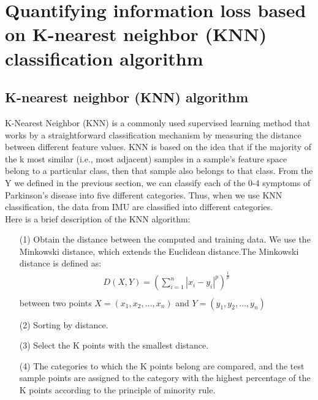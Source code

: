 \chapter{Quantifying information loss based on K-nearest neighbor (KNN) classification algorithm}


\section{K-nearest neighbor (KNN) algorithm}
K-Nearest Neighbor (KNN)\cite{peterson2009k} is a commonly used supervised learning method that works by a straightforward classification mechanism by measuring the distance between different feature values. \cite{altman1992introduction} KNN is based on the idea that if the majority of the k most similar (i.e., most adjacent) samples in a sample's feature space belong to a particular class, then that sample also belongs to that class. From the Y we defined in the previous section, we can classify each of the 0-4 symptoms of Parkinson's disease into five different categories. Thus, when we use KNN classification, the data from IMU are classified into different categories.\\
Here is a brief description of the KNN algorithm:   \cite{guo2003knn,zhang2017learning}

\begin{itemize}
    \item [(1)]
    Obtain the distance between the computed and training data. We use the Minkowski distance, which extends the Euclidean distance.The Minkowski distance \cite{singh2013k} is defined as:
    \begin{equation}\nonumber
    \begin{aligned}
    D(X,Y) = (\sum_{i=1}^{n}\left | x_{i} - y_{i}   \right |^{p})^{\frac{1}{p} } \\
    \end{aligned}
    \end{equation}
    between two points $ X = (x_{1},x_{2},\dots ,x_{n} )$ and $ Y = (y_{1},y_{2},\dots ,y_{n})$ 
    \item [(2)] Sorting by distance.
    \item [(3)] Select the K points with the smallest distance.
    \item [(4)] The categories to which the K points belong are compared, and the test sample points are assigned to the category with the highest percentage of the K points according to the principle of minority rule.
    \end{itemize}  
